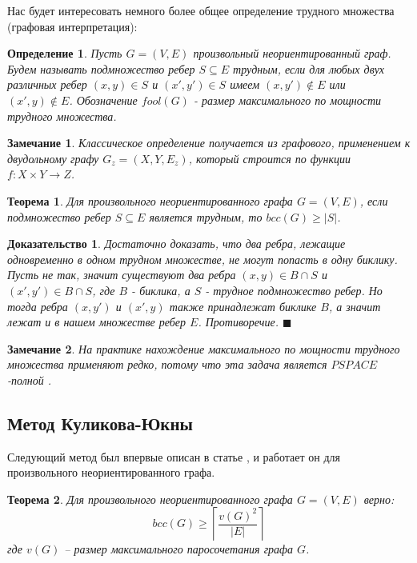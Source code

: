 \documentclass[a4paper]{article}
\newtheorem*{mremark}{Замечание}
\newtheorem*{mdefinition}{Определение}
\newtheorem*{mtheorem}{Теорема}
\newtheorem*{msolution}{Доказательство}
\begin{document}
Нас будет интересовать немного более общее определение трудного множества (графовая интерпретация):
\begin{mdefinition}
	Пусть $G = (V, E)$ произвольный неориентированный граф. Будем называть подмножество ребер 
	$S \subseteq E$ трудным, если для любых двух различных ребер $(x, y)\in S$ и $(x', y')\in S$ 
	имеем $(x, y') \notin E$ или $(x', y) \notin E$. Обозначение $fool(G)$ - размер максимального по 
	мощности трудного множества.
\end{mdefinition}

\begin{mremark}
	Классическое определение получается из графового, применением к двудольному графу $G_z = (X, Y, E_z)$, 
	который строится по функции $f: X\times Y \rightarrow Z$.
\end{mremark}

	
\begin{mtheorem}
    Для произвольного неориентированного графа $G = (V, E)$, если подмножество ребер $S \subseteq E$ 
    является трудным, то $bcc(G) \geq |S|$.
\end{mtheorem}

\begin{msolution}
    Достаточно доказать, что два ребра, лежащие одновременно в одном трудном множестве, не могут 
    попасть в одну биклику. Пусть не так, значит существуют два ребра $(x, y)\in B\cap S$ и 
    $(x', y')\in B\cap S$, где $B$ - биклика, а $S$ - трудное подмножество ребер. Но тогда ребра 
    $(x, y')$ и $(x', y)$ также принадлежат биклике $B$, а значит лежат и в нашем множестве ребер 
    $E$. Противоречие. $\blacksquare$
\end{msolution}

\begin{mremark}
    На практике нахождение максимального по мощности трудного множества применяют редко, потому что 
    эта задача является $PSPACE$-полной \cite{HermannMarkus}. 
\end{mremark}

\subsection{Метод Куликова-Юкны}
Следующий метод был впервые описан в статье \cite{KulikovJukna}, и работает он для произвольного 
неориентированного графа.

\begin{mtheorem}
    Для произвольного неориентированного графа $G = (V, E)$ верно: $$bcc(G)\geq \left\lceil\frac{v(G)^2}{|E|}\right\rceil$$ 
    где $v(G)$ -- размер максимального паросочетания графа $G$.
\end{mtheorem}
\end{document}
